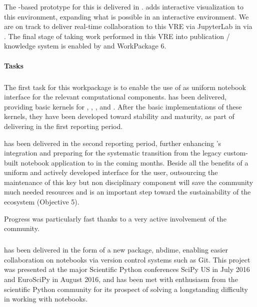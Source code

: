The \Jupyter-based prototype for this is delivered in .
 adds interactive visualization to this environment,
expanding what is possible in an interactive \Jupyter environment.
We are on track to deliver real-time collaboration to this VRE via JupyterLab in  via .
The final stage of taking work performed in this VRE into publication / knowledge system is enabled by  and WorkPackage 6.

\paragraph{Tasks}

\subparagraph{}
\label{UI@ipython-kernels}

The first task for this workpackage is to enable the use of \Jupyter
as uniform notebook interface for the relevant computational
components.  has been delivered,
providing basic \Jupyter kernels for \GAP, \Pari, \Sage, and
\Singular.
After the basic implementations of these kernels,
they have been developed toward stability and maturity,
as part of delivering  in the first reporting period.

 has been delivered in the second reporting period, further
enhancing \Sage's \Jupyter integration and preparing for the
systematic transition from the legacy custom-built \Sage notebook
application to \Jupyter in the coming months. Beside all the benefits
of a uniform and actively developed interface for the user,
outsourcing the maintenance of this key but non disciplinary component
will save the \Sage community much needed resources and is an
important step toward the sustainability of the \ODK ecosystem
(Objective 5).

Progress was particularly fast thanks to a very active involvement of
the \Sage community.

\subparagraph{}

 has been delivered in the form of a new \Jupyter package, nbdime,
enabling easier collaboration on notebooks via version control systems such as Git. This project
was presented at the major Scientific Python conferences SciPy US in July 2016 and EuroSciPy in August 2016,
and has been met with enthusiasm from the scientific Python community for its prospect of solving a
longstanding difficulty in working with notebooks.

